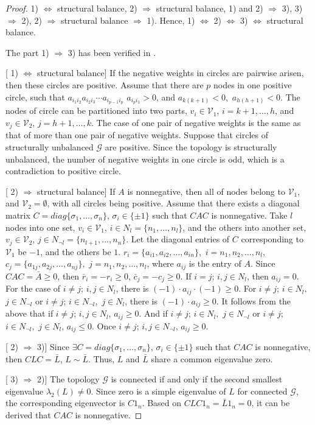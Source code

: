 \documentclass[a4paper,11pt]{article}
\begin{document}
\begin{proof}
1) $\Leftrightarrow$ structural balance, 2) $\Rightarrow$ structural balance, 1) and 2) $\Rightarrow$ 3), 3) $\Rightarrow$ 2), 2) $\Rightarrow$ structural balance $\Rightarrow$ 1). Hence, 1) $\Leftrightarrow$ 2) $\Leftrightarrow$ 3) $\Leftrightarrow$ structural balance.

The part 1) $\Rightarrow$ 3) has been verified in \cite{biconsensus}.

[ 1) $\Leftrightarrow$ structural balance] If the negative weights in circles are pairwise arisen, then these circles are positive. Assume that there are $p$ nodes in one positive circle, such that $a_{i_1i_2}a_{i_2i_3}\cdots a_{i_{p-1}i_p}$ $a_{i_pi_1}>0$, and $a_{k(k+1)}<0,$ $a_{h(h+1)}<0$. The nodes of circle can be partitioned into two parts, $v_i\in\mathcal{V}_1$, $i=k+1,\ldots,h$, and $v_{j}\in\mathcal{V}_2$, $j=h+1,\ldots,k$. The case of one pair of negative weights is the same as that of more than one pair of negative weights. Suppose that circles of structurally unbalanced $\mathcal{G}$ are positive. Since the topology is structurally unbalanced, the number of negative weights in one circle is odd, which is a contradiction to positive circle.

[ 2) $\Rightarrow$ structural balance] If $A$ is nonnegative, then all of nodes belong to $\mathcal{V}_1$, and $\mathcal{V}_2=\emptyset$, with all circles being positive. Assume that there exists a diagonal matrix $C=diag\{\sigma_1,\ldots,\sigma_n\}$, $\sigma_i\in\{\pm 1\}$ such that $CAC$ is nonnegative. Take $l$ nodes into one set, $v_i\in\mathcal{V}_1$, $i\in N_l=\{n_1,\ldots,n_l\}$, and the others into another set, $v_j\in\mathcal{V}_2$, $j\in N_{\neg l}=\{n_{l+1},\ldots,n_n\}$. Let the diagonal entries of $C$ corresponding to $\mathcal{V}_1$ be $-1$, and the others be $1$. $r_i=\{a_{i1},a_{i2},\ldots,a_{in}\},$ $i=n_1,n_2,\ldots,n_l$, $c_j=\{a_{1j},a_{2j},\ldots,a_{nj}\},$ $j=n_1,n_2,\ldots,n_l$, where $a_{ij}$ is the entry of $A$. Since $CAC=\bar A\geq0$, then $\bar r_i=-r_i\geq0$, $\bar c_j=-c_j\geq0.$ If $i=j$; $i,j\in N_l$, then $a_{ij}=0$. For the case of $i\neq j$; $i,j\in N_l$, there is $(-1)\cdot a_{ij}\cdot(-1)\geq 0$. For $i\neq j$; $i\in N_l,$ $j\in N_{\neg l}$ or $i\neq j$; $i\in N_{\neg l},$ $j\in N_l$, there is $(-1)\cdot a_{ij}\geq 0$.  It follows from the above that if $i\neq j$; $i,j\in N_l$, $a_{ij}\geq 0$. And if $i\neq j$; $i\in N_l,$ $j\in N_{\neg l}$ or $i\neq j$; $i\in N_{\neg l},$ $j\in N_l$, $a_{ij}\leq 0$. Once $i\neq j$; $i,j\in N_{\neg l}$, $a_{ij}\geq 0$.

[ 2) $\Rightarrow$ 3)] Since $\exists C=diag\{\sigma_1,\ldots,\sigma_n\}$, $\sigma_i\in\{\pm 1\}$ such that $CAC$ is nonnegative, then $CLC=\bar L$, $L\sim \bar L$. Thus, $L$ and $\bar L$ share a common eigenvalue zero.

[ 3) $\Rightarrow$ 2)] The topology $\mathcal{G}$ is connected if and only if the second smallest eigenvalue $\lambda_{2}(L)\ne0.$ Since zero is a simple eigenvalue of $L$ for connected $\mathcal{G}$, the corresponding eigenvector is $C1_n$. Based on $CLC1_n=\bar L1_n=0$, it can be derived that $CAC$ is nonnegative.
\end{proof}
\end{document}
